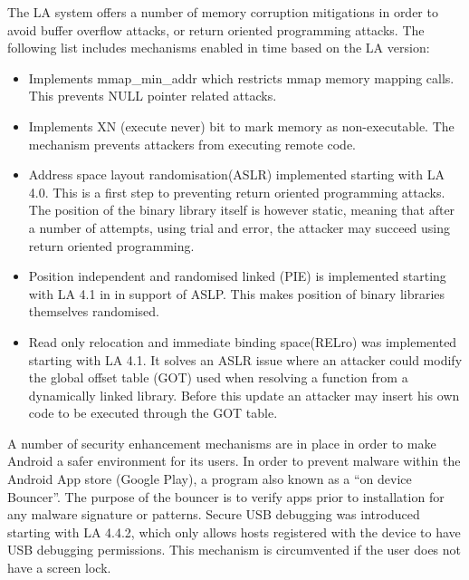The LA system offers a number of memory corruption mitigations in order to avoid buffer overflow attacks, or return oriented programming attacks. The following list includes mechanisms enabled in time based on the LA version:
\begin{itemize}
	\item Implements mmap\_min\_addr which restricts mmap memory mapping calls. This prevents NULL pointer related attacks.
	\item Implements XN (execute never) bit to mark memory as non-executable. The mechanism prevents attackers from executing remote code.
	\item Address space layout randomisation(ASLR) implemented starting with LA 4.0. This is a first step to preventing return oriented programming attacks. The position of the binary library itself is however static, meaning that after a number of attempts, using trial and error, the attacker may succeed using return oriented programming.
	\item Position independent and randomised linked (PIE) is implemented starting with LA 4.1 in in support of ASLP. This makes position of binary libraries themselves randomised.
	\item Read only relocation and immediate binding space(RELro) was implemented starting with LA 4.1. It solves an ASLR issue where an attacker could modify the global offset table (GOT) used when resolving a function from a dynamically linked library. Before this update an attacker may insert his own code to be executed through the GOT table.
\end{itemize}

A number of security enhancement mechanisms are in place in order to make Android a safer environment for its users. In order to prevent malware within the Android App store (Google Play), a program also known as a ``on device Bouncer''. The purpose of the bouncer is to verify apps prior to installation for any malware signature or patterns. Secure USB debugging was introduced starting with LA 4.4.2, which only allows hosts registered with the device to have USB debugging permissions. This mechanism is circumvented if the user does not have a screen lock.


